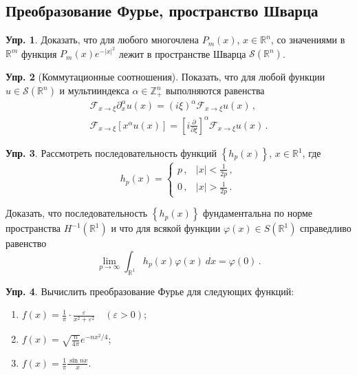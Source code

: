 \documentclass[a4paper, 12pt]{article}
\theoremstyle{definition}
\newtheorem{exercise}{Упр.}
\begin{document}
\subsection{Преобразование Фурье, пространство Шварца} %

\begin{exercise} %
    Доказать, что для любого многочлена \({ P_{m}(x) }\), \({ x \in \mathbb R^{n} }\), со значениями в \({ \mathbb R^{m} }\) функция \({ P_{m}(x) e^{-\lvert x \rvert^2} }\) лежит в пространстве Шварца \({ \mathcal S(\mathbb R^{n}) }\).
\end{exercise}

\begin{exercise}[Коммутационные соотношения]
    Показать, что для любой функции \({ u \in \mathcal S(\mathbb R^{n}) }\) и мультииндекса \({ \alpha \in \mathbb Z_{+}^{n} }\) выполняются равенства
    \[
        \begin{gathered}
            \mathcal F_{x \to \xi} \partial_{x}^{\alpha} u(x) = (i\xi)^{\alpha} \mathcal F_{x \to \xi} u(x)\,, \\
            \mathcal F_{x \to \xi} \left[ x^{\alpha} u(x) \right] = \left[ i \frac{\partial}{\partial \xi} \right]^{\alpha} \mathcal F_{x \to \xi}u(x)\,.
        \end{gathered}
    \]
\end{exercise}

\begin{exercise} %
    Рассмотреть последовательность функций \({ \left\{ h_{p}(x) \right\} }\), \({ x \in \mathbb R^{1} }\), где \[
        h_{p}(x) = \begin{cases}
            p\,, & \lvert x \rvert < \frac{1}{2p}\,, \\
            0\,, & \lvert x \rvert > \frac{1}{2p}\,.
        \end{cases}
    \]

    Доказать, что последовательность \({ \left\{ h_{p}(x) \right\} }\) фундаментальна по норме пространства \({ H^{-1}(\mathbb R^{1}) }\) и что для всякой функции \({ \varphi(x) \in S(\mathbb R^{1}) }\) справедливо равенство \[
        \lim_{p \to \infty} \int_{\mathbb R^{1}} h_{p}(x) \varphi(x)\: dx = \varphi(0)\,.
    \]
\end{exercise}

\begin{exercise} %
    Вычислить преобразование Фурье для следующих функций:
    \begin{enumerate}
        \item \({ \displaystyle f(x) = \frac{1}{\pi} \cdot \frac{\varepsilon}{x^2 + \varepsilon^2} \quad (\varepsilon > 0) }\);
        \item \({ \displaystyle f(x) = \sqrt{\frac{n}{4\pi}} e^{-n x^2 / 4} }\);
        \item \({ \displaystyle f(x) = \frac{1}{\pi} \frac{\sin nx}{x} }\).
    \end{enumerate}
\end{exercise}
\end{document}
